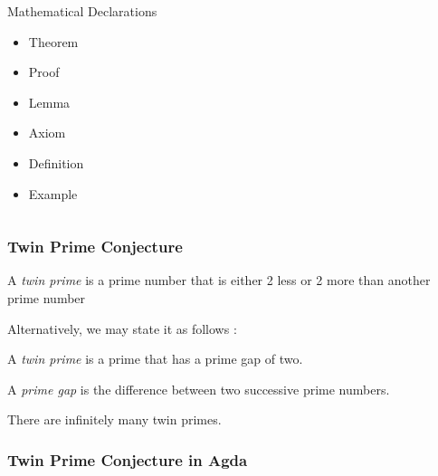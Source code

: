 \documentclass[10pt]{beamer}
\begin{document}
\begin{frame}

\begin{columns}

\begin{column}{0.4 \textwidth}

\begin{block}{Mathematical Declarations}
  \begin{itemize}
    \item Theorem
    \item Proof
    \item Lemma
    \item Axiom
    \item Definition
    \item Example
  \end{itemize}
\end{block}

\end{column}

\begin{column}{0.7 \textwidth}

% 

\end{column}
\end{columns}
\end{frame}


\begin{frame}
\frametitle{Twin Prime Conjecture}
\begin{Definition}
A \emph{twin prime} is a prime number that is either 2 less or 2 more than another prime number
\end{Definition}
Alternatively, we may state it as follows :
\begin{Definition}
A \emph{twin prime} is a prime that has a prime gap of two.
\end{Definition}
\begin{Definition}
A \emph{prime gap} is the difference between two successive prime numbers.
\end{Definition}

\begin{theorem}
There are infinitely many twin primes.
\end{theorem}

\end{frame}

\begin{frame}

\frametitle{Twin Prime Conjecture in Agda}

% 

\end{frame}
\end{document}
